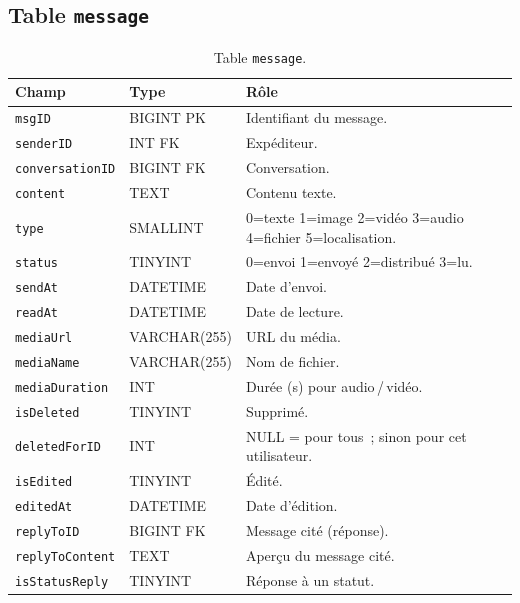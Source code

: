 \documentclass[11pt,a4paper,oneside]{report}
\newcommand{\thd}[1]{\textbf{\textcolor{AlanyaIndigoDark}{#1}}}
\begin{document}
\subsection{Table \texttt{message}}
\begin{table}[H]
\centering
\begin{tabularx}{\linewidth}{@{}l l X@{}}
\toprule
\thd{Champ} & \thd{Type} & \thd{R\^{o}le}\\
\midrule
\texttt{msgID}          & BIGINT PK  & Identifiant du message.\\
\texttt{senderID}       & INT FK     & Exp\'{e}diteur.\\
\texttt{conversationID} & BIGINT FK  & Conversation.\\
\texttt{content}        & TEXT       & Contenu texte.\\
\texttt{type}           & SMALLINT   & 0=texte 1=image 2=vid\'{e}o 3=audio 4=fichier 5=localisation.\\
\texttt{status}         & TINYINT    & 0=envoi 1=envoy\'{e} 2=distribu\'{e} 3=lu.\\
\texttt{sendAt}         & DATETIME   & Date d'envoi.\\
\texttt{readAt}         & DATETIME   & Date de lecture.\\
\texttt{mediaUrl}       & VARCHAR(255) & URL du m\'{e}dia.\\
\texttt{mediaName}      & VARCHAR(255) & Nom de fichier.\\
\texttt{mediaDuration}  & INT        & Dur\'{e}e (s) pour audio\,/\,vid\'{e}o.\\
\texttt{isDeleted}      & TINYINT    & Supprim\'{e}.\\
\texttt{deletedForID}   & INT        & NULL = pour tous~; sinon pour cet utilisateur.\\
\texttt{isEdited}       & TINYINT    & \'{E}dit\'{e}.\\
\texttt{editedAt}       & DATETIME   & Date d'\'{e}dition.\\
\texttt{replyToID}      & BIGINT FK  & Message cit\'{e} (r\'{e}ponse).\\
\texttt{replyToContent} & TEXT       & Aper\c{c}u du message cit\'{e}.\\
\texttt{isStatusReply}  & TINYINT    & R\'{e}ponse \`{a} un statut.\\
\bottomrule
\end{tabularx}
\caption{Table \texttt{message}.}
\end{table}
\end{document}
